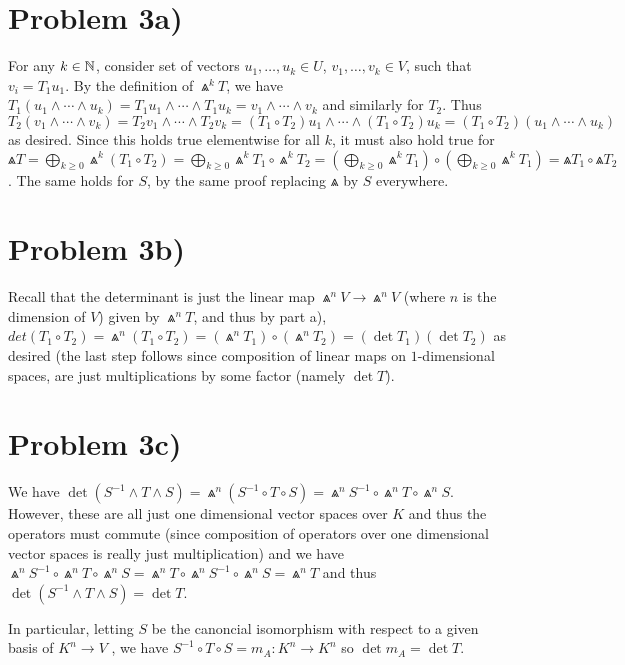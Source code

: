 \section*{Problem 3a)}
For any $k\in \mathbb{N}$, consider set of vectors $u_1,\ldots, u_k \in U$, $v_1,\ldots, v_k\in V$, such that $v_i = T_1u_1$. By the definition of $\Wedge^k T$, we have $T_1(u_1\wedge\cdots\wedge u_k)=T_1u_1\wedge \cdots \wedge T_1u_k=v_1\wedge\cdots\wedge v_k$ and similarly for $T_2$. Thus $T_2(v_1\wedge\cdots\wedge v_k)=T_2v_1\wedge \cdots \wedge T_2v_k = (T_1\circ T_2) u_1 \wedge \cdots \wedge (T_1\circ T_2) u_k = (T_1\circ T_2)(u_1\wedge\cdots\wedge u_k)$ as desired. Since this holds true elementwise for all $k$, it must also hold true for $\Wedge T = \bigoplus_{k\geq 0} \Wedge^k (T_1\circ T_2) = \bigoplus_{k\geq 0} \Wedge^k T_1\circ \Wedge^k T_2 = (\bigoplus_{k\geq 0} \Wedge^k T_1)\circ (\bigoplus_{k\geq 0} \Wedge^k T_1) = \Wedge T_1\circ \Wedge T_2$. The same holds for $S$, by the same proof replacing $\Wedge$ by $S$ everywhere.
\section*{Problem 3b)}
Recall that the determinant is just the linear map $\Wedge^n V \to \Wedge^n V$ (where $n$ is the dimension of $V$) given by $\Wedge^n T$, and thus by part a), $det (T_1\circ T_2) = \Wedge^n (T_1\circ T_2) = (\Wedge^n T_1)\circ (\Wedge^n T_2) = (\det T_1)(\det T_2)$ as desired (the last step follows since composition of linear maps on $1$-dimensional spaces, are just multiplications by some factor (namely $\det T$).
\section*{Problem 3c)}
We have $\det (S^{-1} \wedge T \wedge S) = \Wedge^n (S^{-1} \circ T \circ S) = \Wedge^n S^{-1} \circ \Wedge^n T \circ \Wedge^n S$. However, these are all just one dimensional vector spaces over $K$ and thus the operators must commute (since composition of operators over one dimensional vector spaces is really just multiplication) and we have $\Wedge^n S^{-1} \circ \Wedge^n T \circ \Wedge^n S =\Wedge^n T \circ \Wedge^n S^{-1} \circ \Wedge^n S = \Wedge^n T$ and thus $\det (S^{-1} \wedge T \wedge S) = \det T$. \par
In particular, letting $S$ be the canoncial isomorphism with respect to a given basis of $K^n \to V$ , we have $S^{-1}\circ T \circ S = m_A: K^n \to K^n$ so $\det m_A = \det T$.
